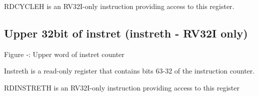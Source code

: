 RDCYCLEH is an RV32I-only instruction providing access to this register.

\subsection{Upper 32bit of instret (instreth - RV32I
only)}\label{upper-32bit-of-instret-instreth---rv32i-only}

\missingfigure{}

Figure ‑: Upper word of instret counter

Instreth is a read-only register that contains bits 63-32 of the
instruction counter.

RDINSTRETH is an RV32I-only instruction providing access to this
register